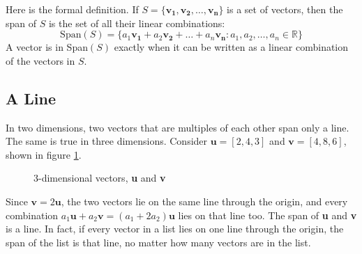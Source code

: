Here is the formal definition. If
$S = \{\mathbf{v_1}, \mathbf{v_2}, \dots, \mathbf{v_n}\}$ is a set of vectors, then
the span of $S$ is the set of all their linear combinations:
\begin{equation}
\text{Span}(S) = \{a_1 \mathbf{v_1} + a_2 \mathbf{v_2} + \dots + a_n
\mathbf{v_n} : a_1, a_2, \dots, a_n \in \mathbb{R}\}
\end{equation}
A vector is in Span$(S)$ exactly when it can be written as a linear
combination of the vectors in $S$.

\subsection{A Line}
In two dimensions, two vectors that are multiples of each other span only a
line. The same is true in three dimensions. Consider
$\mathbf{u} = \left[ 2, 4, 3 \right]$ and $\mathbf{v} = \left[ 4, 8, 6 \right]$,
shown in figure \ref{fig:3d_vectors-span}.

\begin{figure}[H]
\centering
{} 
\caption{3-dimensional vectors, \textbf{u} and \textbf{v}}
\label{fig:3d_vectors-span}
\end{figure}

Since $\mathbf{v} = 2\mathbf{u}$, the two vectors lie on the same line through
the origin, and every combination $a_1\mathbf{u} + a_2\mathbf{v} = (a_1 + 2a_2)\mathbf{u}$
lies on that line too. The span of \textbf{u} and \textbf{v} is a line. In fact,
if every vector in a list lies on one line through the origin, the span of the
list is that line, no matter how many vectors are in the list.

